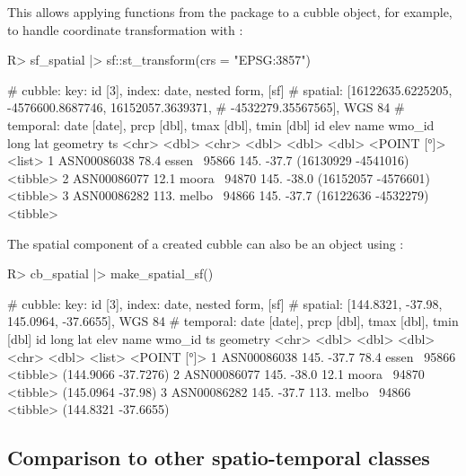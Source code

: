 \documentclass[
  shortnames]{jss}
\begin{document}
This allows applying functions from the  package to a cubble object, for example, to handle coordinate transformation with :

\begin{CodeChunk}
\begin{CodeInput}
R> sf_spatial |> sf::st_transform(crs = "EPSG:3857")
\end{CodeInput}
\begin{CodeOutput}
# cubble:   key: id [3], index: date, nested form, [sf]
# spatial:  [16122635.6225205, -4576600.8687746, 16152057.3639371,
#   -4532279.35567565], WGS 84
# temporal: date [date], prcp [dbl], tmax [dbl], tmin [dbl]
  id           elev name   wmo_id  long   lat            geometry ts      
  <chr>       <dbl> <chr>   <dbl> <dbl> <dbl>         <POINT [°]> <list>  
1 ASN00086038  78.4 essen~  95866  145. -37.7 (16130929 -4541016) <tibble>
2 ASN00086077  12.1 moora~  94870  145. -38.0 (16152057 -4576601) <tibble>
3 ASN00086282 113.  melbo~  94866  145. -37.7 (16122636 -4532279) <tibble>
\end{CodeOutput}
\end{CodeChunk}

The spatial component of a created cubble can also be an  object using :

\begin{CodeChunk}
\begin{CodeInput}
R> cb_spatial |> make_spatial_sf() 
\end{CodeInput}
\begin{CodeOutput}
# cubble:   key: id [3], index: date, nested form, [sf]
# spatial:  [144.8321, -37.98, 145.0964, -37.6655], WGS 84
# temporal: date [date], prcp [dbl], tmax [dbl], tmin [dbl]
  id           long   lat  elev name   wmo_id ts                  geometry
  <chr>       <dbl> <dbl> <dbl> <chr>   <dbl> <list>           <POINT [°]>
1 ASN00086038  145. -37.7  78.4 essen~  95866 <tibble> (144.9066 -37.7276)
2 ASN00086077  145. -38.0  12.1 moora~  94870 <tibble>   (145.0964 -37.98)
3 ASN00086282  145. -37.7 113.  melbo~  94866 <tibble> (144.8321 -37.6655)
\end{CodeOutput}
\end{CodeChunk}

\hypertarget{tidyverse}{%
\subsection{Comparison to other spatio-temporal classes}\label{tidyverse}}
\end{document}
